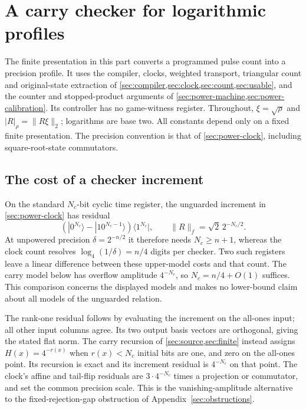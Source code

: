 \section{A carry checker for logarithmic profiles}\label{sec:profile-clock}
The finite presentation in this part converts a programmed pulse count into a precision profile. It uses the compiler, clocks, weighted transport, triangular count and original-state extraction of \cref{sec:compiler,sec:clock,sec:count,sec:usable}, and the counter and stopped-product arguments of \cref{sec:power-machine,sec:power-calibration}. Its controller has no game-witness register. Throughout, $\xi=\sqrt\rho$ and $|R|_\rho=\|R\xi\|_2$; logarithms are base two. All constants depend only on a fixed finite presentation. The precision convention is that of \cref{sec:power-clock}, including square-root-state commutators.

\subsection{The cost of a checker increment}
\begin{remark}\label{rem:profile-overflow}
On the standard $N_c$-bit cyclic time register, the unguarded increment in \cref{sec:power-clock} has residual
\[
 (|0^{N_c}\rangle-|10^{N_c-1}\rangle)\langle1^{N_c}|,
 \qquad \|R\|_f=\sqrt2\,2^{-N_c/2}.
\]
At unpowered precision $\delta=2^{-n/2}$ it therefore needs $N_c\ge n+1$, whereas the clock count resolves $\log_4(1/\delta)=n/4$ digits per checker. Two such registers leave a linear difference between these upper-model costs and that count. The carry model below has overflow amplitude $4^{-N_c}$, so $N_c=n/4+O(1)$ suffices. This comparison concerns the displayed models and makes no lower-bound claim about all models of the unguarded relation.
\end{remark}
The rank-one residual follows by evaluating the increment on the all-ones input; all other input columns agree. Its two output basis vectors are orthogonal, giving the stated flat norm. The carry recursion of \cref{sec:source,sec:finite} instead assigns $H(x)=4^{-r(x)}$ when $r(x)<N_c$ initial bits are one, and zero on the all-ones point. Its recursion is exact and its increment residual is $4^{-N_c}$ on that point. The clock's affine and tail-flip residuals are $3\cdot4^{-N_c}$ times a projection or commutator, and set the common precision scale. This is the vanishing-amplitude alternative to the fixed-rejection-gap obstruction of Appendix~\ref{sec:obstructions}.

